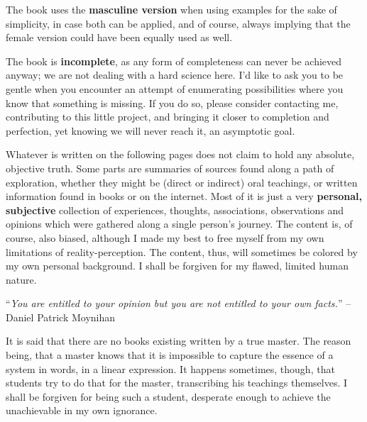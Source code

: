 The book uses the \textbf{masculine version} when using examples for the sake of simplicity, in case both can be applied, and of course, always implying that the female version could have been equally used as well.

The book is \textbf{incomplete}, as any form of completeness can never be achieved anyway; we are not dealing with a hard science here.
I'd like to ask you to be gentle when you encounter an attempt of enumerating possibilities where you know that something is missing.
If you do so, please consider contacting me, contributing to this little project, and bringing it closer to completion and perfection, yet knowing we will never reach it, an asymptotic goal.

Whatever is written on the following pages does not claim to hold any absolute, objective truth.
Some parts are summaries of sources found along a path of exploration, whether they might be (direct or indirect) oral teachings, or written information found in books or on the internet.
Most of it is just a very \textbf{personal, subjective} collection of experiences, thoughts, associations, observations and opinions which were gathered along a single person's journey.
The content is, of course, also biased, although I made my best to free myself from my own limitations of reality-perception.
The content, thus, will sometimes be colored by my own personal background.
I shall be forgiven for my flawed, limited human nature.

\begin{displayquote}
    ``\textit{You are entitled to your opinion but you are not entitled to your own facts.}'' -- Daniel Patrick Moynihan
\end{displayquote}

It is said that there are no books existing written by a true master.
The reason being, that a master knows that it is impossible to capture the essence of a system in words, in a linear expression.
It happens sometimes, though, that students try to do that for the master, transcribing his teachings themselves.
I shall be forgiven for being such a student, desperate enough to achieve the unachievable in my own ignorance.
